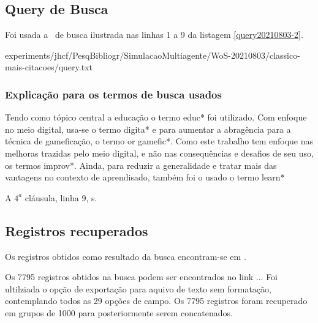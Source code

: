 \subsection{Query de Busca}

Foi usada a \query\  de busca ilustrada nas linhas 1 a 9 da listagem \ref{query20210803-2}.


{experiments/jhcf/PesqBibliogr/SimulacaoMultiagente/WoS-20210803/classico-mais-citacoes/query.txt}

\subsubsection{Explicação para os termos de busca usados\label{}}



Tendo como tópico central a educação o termo educ*  foi utilizado. Com enfoque no meio digital, usa-se o termo digita* e para aumentar a abragência para  a técnica de gameficação, o termo or gamefic*. Como este trabalho tem enfoque nas melhoras trazidas pelo meio digital, e não nas consequências e desafios de seu uso, os termos improv*. Ainda, para reduzir a generalidade e tratar mais das vantagens no contexto de aprendisado, também foi o usado o termo learn*





A $4^{a}$ cláusula, linha 9,  s.

\subsection{Registros recuperados}

Os  registros obtidos como resultado da busca encontram-se em \url{}. 

Os 7795 registros obtidos na busca podem ser encontrados no link ...
Foi ultilziada o opção de exportação para aquivo de texto sem formatação, contemplando todos as 29 opções de campo. Os 7795 registros foram recuperado em grupos de 1000 para posteriormente serem concatenados.

